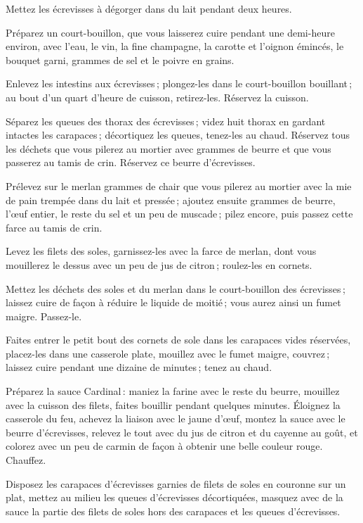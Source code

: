 Mettez les écrevisses à dégorger dans du lait pendant deux heures.

Préparez un court-bouillon, que vous laisserez cuire pendant une demi-heure
environ, avec l'eau, le vin, la fine champagne, la carotte et l'oignon émincés,
le bouquet garni, {\mmm} grammes de sel et le poivre en grains.

Enlevez les intestins aux écrevisses ; plongez-les dans le court-bouillon
bouillant ; au bout d'un quart d'heure de cuisson, retirez-les. Réservez la
cuisson.

Séparez les queues des thorax des écrevisses ; videz huit thorax en gardant
intactes les carapaces ; décortiquez les queues, tenez-les au chaud. Réservez
tous les déchets que vous pilerez au mortier avec {\mmm} grammes de beurre et que
vous passerez au tamis de crin. Réservez ce beurre d'écrevisses.

Prélevez sur le merlan {\mmm} grammes de chair que vous pilerez au mortier avec la
mie de pain trempée dans du lait et pressée ; ajoutez ensuite {\mmm} grammes de
beurre, l'œuf entier, le reste du sel et un peu de muscade ; pilez encore, puis
passez cette farce au tamis de crin.

Levez les filets des soles, garnissez-les avec la farce de merlan, dont vous
mouillerez le dessus avec un peu de jus de citron ; roulez-les en cornets.

Mettez les déchets des soles et du merlan dans le court-bouillon des
écrevisses ; laissez cuire de façon à réduire le liquide de moitié ; vous aurez
ainsi un fumet maigre. Passez-le.

Faites entrer le petit bout des cornets de sole dans les carapaces vides
réservées, placez-les dans une casserole plate, mouillez avec le fumet maigre,
couvrez ; laissez cuire pendant une dizaine de minutes ; tenez au chaud.

Préparez la sauce Cardinal : maniez la farine avec le reste du beurre, mouillez
avec la cuisson des filets, faites bouillir pendant quelques minutes. Éloignez
la casserole du feu, achevez la liaison avec le jaune d'œuf, montez la sauce
avec le beurre d'écrevisses, relevez le tout avec du jus de citron et du
cayenne au goût, et colorez avec un peu de carmin de façon à obtenir une belle
couleur rouge. Chauffez.

Disposez les carapaces d'écrevisses garnies de filets de soles en couronne sur un
plat, mettez au milieu les queues d'écrevisses décortiquées, masquez avec de la
sauce la partie des filets de soles hors des carapaces et les queues d'écrevisses.

